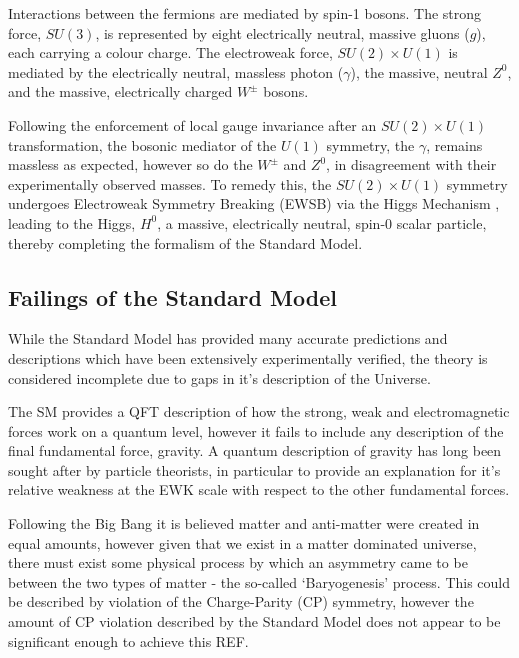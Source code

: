 Interactions between the fermions are mediated by spin-1 bosons. The strong 
force, $SU(3)$, is represented by eight electrically neutral, massive gluons 
($g$), each carrying a colour charge. The electroweak force, $SU(2)\times U(1)$
is
mediated by the electrically neutral, massless photon ($\gamma$), the massive,
neutral $Z^0$, and the massive, electrically charged $W^{\pm}$ bosons.

Following the enforcement of local gauge invariance after an
$SU(2)\times U (1)$ transformation,
the bosonic mediator of the $U(1)$ symmetry, the $\gamma$, remains massless as
expected, however so do the $W^{\pm}$ and $Z^0$, in disagreement with their
experimentally observed masses. To remedy this, the $SU(2)\times U(1)$ symmetry
undergoes Electroweak Symmetry Breaking (EWSB) via the Higgs Mechanism
\cite{PhysRevLett.13.321,PhysRevLett.13.508,PhysRevLett.13.585}, 
leading to the Higgs, $H^0$, a massive, electrically neutral, spin-0
scalar particle, thereby completing the formalism of the Standard Model.



\subsection{Failings of the Standard Model}

While the Standard Model has provided many accurate predictions and descriptions
which have been extensively experimentally verified, the theory is considered
incomplete due to gaps in it's description of the Universe.

The SM provides a QFT description of how the strong, weak and electromagnetic
forces work on a quantum level, however it fails to include any description of
the final fundamental force, gravity. A quantum description of gravity has long
been sought after by particle theorists, in particular to provide an explanation
for it's relative weakness at the EWK scale with respect to the other
fundamental forces.

Following the Big Bang it is believed matter and anti-matter were created in
equal amounts, however given that we exist in a matter dominated universe, there
must exist some physical process by which an asymmetry came to be between the
two types of matter - the so-called `Baryogenesis' process. This could
be described by violation of the Charge-Parity (CP) symmetry,
however the amount of CP violation described by the Standard Model
does not appear to be significant enough to achieve this REF.


